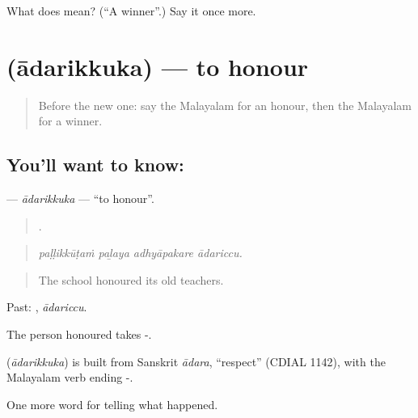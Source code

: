 \begin{tcolorbox}[breakable,colback=teal!4,colframe=teal!35!black,title={Before you move on}]
What does  mean? (\textquotedblleft{}A winner\textquotedblright{}.) Say it once more.
\end{tcolorbox}
\section[\texorpdfstring{\ml{ആദരിക്കുക} (ādarikkuka)}{ആദരിക്കുക (ādarikkuka)}]{ (ādarikkuka) — to honour}

\label{lesson:ML-C396-adarikkuka}



\begin{quote}
Before the new one: say the Malayalam for an honour, then the Malayalam for a winner.
\end{quote}

\subsection*{You'll want to know: }
\textbf{} — \emph{ādarikkuka} — \textquotedblleft{}to honour\textquotedblright{}.

\begin{quote}
   .
\end{quote}

\begin{quote}
\emph{paḷḷikkūṭaṁ paḻaya adhyāpakare ādariccu.}
\end{quote}

\begin{quote}
The school honoured its old teachers.
\end{quote}

Past: , \emph{ādariccu}.

The person honoured takes -.

\begin{cousinweb}
\textbf{} (\emph{ādarikkuka}) is built from Sanskrit \emph{ādara}, \textquotedblleft{}respect\textquotedblright{} (CDIAL 1142), with the Malayalam verb ending -.
\end{cousinweb}

\begin{grammarlens}[title={What you've built}]
One more word for telling what happened.
\end{grammarlens}

